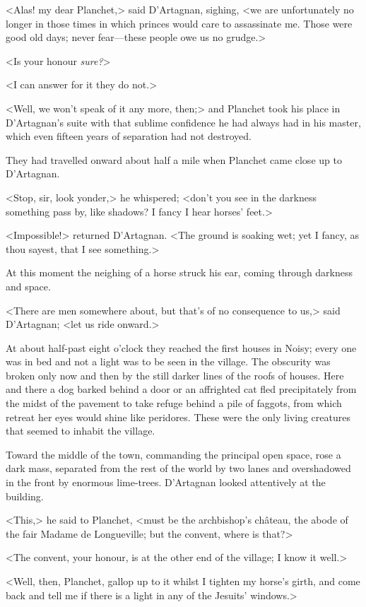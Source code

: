 <Alas! my dear Planchet,> said D'Artagnan, sighing, <we are unfortunately no longer in those times in which princes would care to assassinate me. Those were good old days; never fear—these people owe us no grudge.>

<Is your honour \emph{sure?}>

<I can answer for it they do not.>

<Well, we won't speak of it any more, then;> and Planchet took his place in D'Artagnan's suite with that sublime confidence he had always had in his master, which even fifteen years of separation had not destroyed.

They had travelled onward about half a mile when Planchet came close up to D'Artagnan.

<Stop, sir, look yonder,> he whispered; <don't you see in the darkness something pass by, like shadows? I fancy I hear horses' feet.>

<Impossible!> returned D'Artagnan. <The ground is soaking wet; yet I fancy, as thou sayest, that I see something.>

At this moment the neighing of a horse struck his ear, coming through darkness and space.

<There are men somewhere about, but that's of no consequence to us,> said D'Artagnan; <let us ride onward.>

At about half-past eight o'clock they reached the first houses in Noisy; every one was in bed and not a light was to be seen in the village. The obscurity was broken only now and then by the still darker lines of the roofs of houses. Here and there a dog barked behind a door or an affrighted cat fled precipitately from the midst of the pavement to take refuge behind a pile of faggots, from which retreat her eyes would shine like peridores. These were the only living creatures that seemed to inhabit the village.

Toward the middle of the town, commanding the principal open space, rose a dark mass, separated from the rest of the world by two lanes and overshadowed in the front by enormous lime-trees. D'Artagnan looked attentively at the building.

<This,> he said to Planchet, <must be the archbishop's château, the abode of the fair Madame de Longueville; but the convent, where is that?>

<The convent, your honour, is at the other end of the village; I know it well.>

<Well, then, Planchet, gallop up to it whilst I tighten my horse's girth, and come back and tell me if there is a light in any of the Jesuits' windows.>


